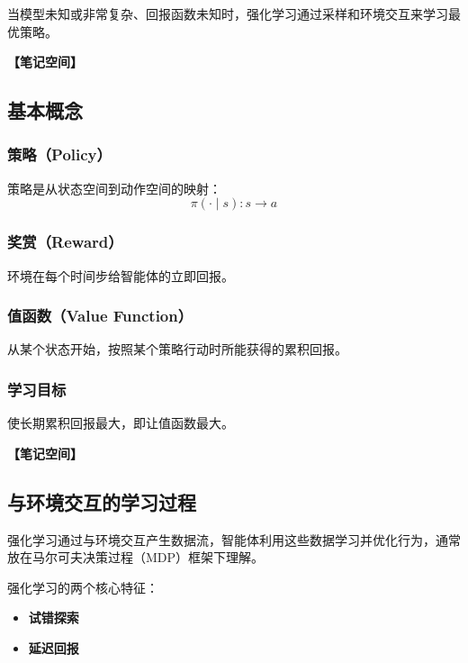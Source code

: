 \documentclass[12pt,a4paper]{article}
\newcommand{\notespace}[1][3cm]{%
  \vspace{#1}%
  \noindent\textbf{【笔记空间】}%
  \vspace{#1}%
}
\newcommand{\1}{\mathbf{1}}
\begin{document}
\begin{keybox}
当模型未知或非常复杂、回报函数未知时，强化学习通过采样和环境交互来学习最优策略。
\end{keybox}

\notespace[2cm]

\subsection{基本概念}

\subsubsection*{策略（Policy）}

策略是从状态空间到动作空间的映射：
\begin{equation}
\pi(\cdot \mid s): s \rightarrow a
\end{equation}

\subsubsection*{奖赏（Reward）}

环境在每个时间步给智能体的立即回报。

\subsubsection*{值函数（Value Function）}

从某个状态开始，按照某个策略行动时所能获得的累积回报。

\subsubsection*{学习目标}

使长期累积回报最大，即让值函数最大。

\notespace[2cm]

\subsection{与环境交互的学习过程}

强化学习通过与环境交互产生数据流，智能体利用这些数据学习并优化行为，通常放在马尔可夫决策过程（MDP）框架下理解。

强化学习的两个核心特征：

\begin{itemize}[leftmargin=2em]
  \item \textbf{试错探索}
  \item \textbf{延迟回报}
\end{itemize}
\end{document}
